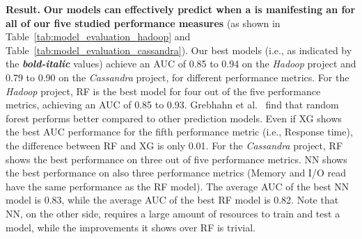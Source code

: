 \noindent \textbf{Result.}
\noindent \textbf{Our models can effectively predict when a \instance is manifesting an \inconsistent for all of our five studied performance measures} (as shown in Table~\ref{tab:model_evaluation_hadoop} 
and Table~\ref{tab:model_evaluation_cassandra}). 
Our best models (i.e., as indicated by the \textbf{\textit{bold-italic}} values) achieve an AUC of 0.85 to 0.94 on the \emph{Hadoop} project and 0.79 to 0.90 on the \emph{Cassandra} project, for different performance metrics.
For the \emph{Hadoop} project, %
RF is the best model for four out of the five performance metrics, achieving an AUC of 0.85 to 0.93. Grebhahn et al.~\cite{grebhahn2019predicting} find that random forest performs better compared to other prediction models. Even if XG shows the best AUC performance for the fifth performance metric (i.e., Response time), the difference between RF and XG is only 0.01. 
For the \emph{Cassandra} project, RF shows the best performance on three out of five performance metrics. NN shows the best performance on also three performance metrics (Memory and I/O read have the same performance as the RF model). The average AUC of the best NN model is 0.83, while the average AUC of the best RF model is 0.82. 
Note that %
NN, on the other side, requires a large amount of resources to train and test a model, while the improvements it shows over RF is trivial.
